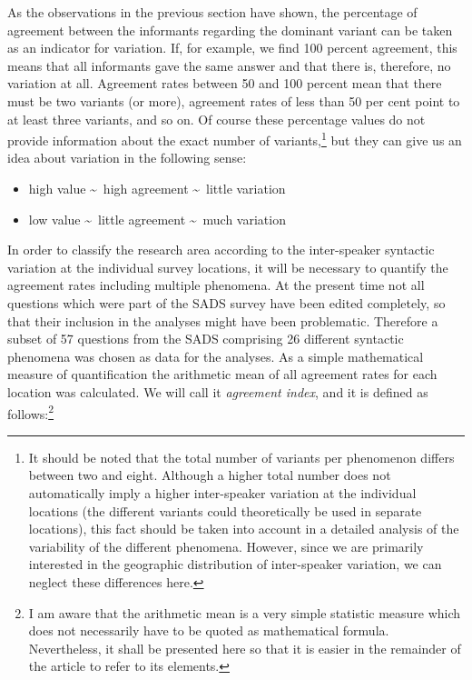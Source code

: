 \documentclass[output=paper]{LSP/langsci}
\begin{document}
As the observations in the previous section have shown, the percentage of agreement between the informants regarding the dominant variant can be taken as an indicator for variation. If, for example, we find 100 percent agreement, this means that all informants gave the same answer and that there is, therefore, no variation at all. Agreement rates between 50 and 100 percent mean that there must be two variants (or more), agreement rates of less than 50 per cent point to at least three variants, and so on. Of course these percentage values do not provide information about the exact number of variants,\footnote{ It should be noted that the total number of variants per phenomenon differs between two and eight. Although a higher total number does not automatically imply a higher inter-speaker variation at the individual locations (the different variants could theoretically be used in separate locations), this fact should be taken into account in a detailed analysis of the variability of the different phenomena. However, since we are primarily interested in the geographic distribution of inter-speaker variation, we can neglect these differences here.} but they can give us an idea about variation in the following sense:

\begin{itemize}
\item high value \textasciitilde ~high agreement \textasciitilde ~little variation
\item low value \textasciitilde ~little agreement \textasciitilde ~much variation
\end{itemize}

In order to classify the research area according to the inter-speaker syntactic variation at the individual survey locations, it will be necessary to quantify the agreement rates including multiple phenomena. At the present time not all questions which were part of the SADS survey have been edited completely, so that their inclusion in the analyses might have been problematic. Therefore a subset of 57 questions from the SADS comprising 26 different syntactic phenomena was chosen as data for the analyses. As a simple mathematical measure of quantification the arithmetic mean of all agreement rates for each location was calculated. We will call it \emph{agreement index}, and it is defined as follows:\footnote{I am aware that the arithmetic mean is a very simple statistic measure which does not necessarily have to be quoted as mathematical formula. Nevertheless, it shall be presented here so that it is easier in the remainder of the article to refer to its elements. }
\end{document}
